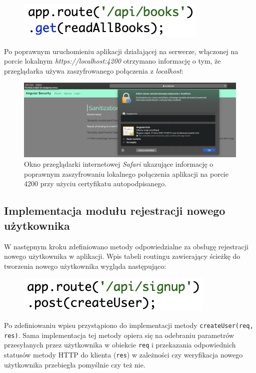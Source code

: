 \begin{figure}[h]
	\includegraphics[scale=0.7]{images/code/app_route.png}
	\label{Rys:nodejs}
\end{figure}

Po poprawnym uruchomieniu aplikacji działającej na serwerze, włączonej na porcie lokalnym \textit{https://localhost:4200} otrzymano informację o tym, że przeglądarka używa zaszyfrowanego połączenia z \textit{localhost}:

\begin{figure}[h]
	\centering\includegraphics[scale=0.35]{images/nodejs/secure-cert.png}
	\caption{Okno przeglądarki internetowej \textit{Safari} ukazujące informację o poprawnym zaszyfrowaniu lokalnego połączenia aplikacji na porcie 4200 przy użyciu certyfikatu autopodpisanego.}
	\label{Rys:nodejs}
\end{figure}

\subsection{Implementacja modułu rejestracji nowego użytkownika} 
W następnym kroku zdefiniowano metody odpowiedzialne za obsługę rejestracji nowego użytkownika w aplikacji. Wpis tabeli routingu zawierający ścieżkę do tworzenia nowego użytkownika wygląda następująco:

\begin{figure}[h]
	\includegraphics[scale=0.7]{images/code/app_route_user.png}
	\label{Rys:nodejs}
\end{figure}

Po zdefiniowaniu wpisu przystąpiono do implementacji metody \texttt{createUser(req, res)}. Sama implementacja tej metody opiera się na odebraniu parametrów przesyłanych przez użytkownika w obiekcie \texttt{req} i przekazania odpowiednich statusów metody HTTP do klienta (\texttt{res}) w zależności czy weryfikacja nowego użytkownika przebiegła pomyślnie czy też nie. 

